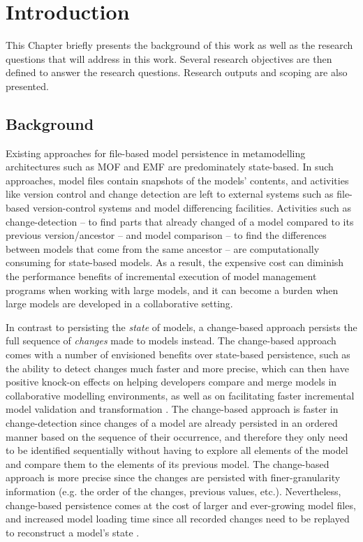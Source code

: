 \documentclass[12pt, a4paper]{report} \usepackage[titletoc]{appendix}
\begin{document}
\tableofcontents
{}

\listoffigures
\newpage
 
\listoftables
\newpage

\lstlistoflistings
\newpage

\chapter{Introduction}
\label{ch:introduction}
This Chapter briefly presents the background of this work as well as the research questions that will address in this work. Several research objectives are then defined to answer the research questions. Research outputs and scoping are also presented. 

\section{Background}
\label{sec:background}
Existing approaches for file-based model persistence in metamodelling architectures such as MOF and EMF are predominately state-based. In such approaches, model files contain snapshots of the models' contents, and activities like version control and change detection are left to external systems such as file-based version-control systems and model differencing facilities. Activities such as change-detection -- to find parts that already changed of a model compared to its previous version/ancestor -- and model comparison -- to find the differences between models that come from the same ancestor -- are computationally consuming for state-based models. As a result,  the expensive cost can diminish the performance benefits of incremental execution of model management programs when working with large models, and it can become a burden when large models are developed in a collaborative setting.

In contrast to persisting the \emph{state} of models, a change-based approach persists the full sequence of \emph{changes} made to models instead. The change-based approach comes with a number of envisioned benefits over state-based persistence, such as the ability to detect changes much faster and more precise, which can then have positive knock-on effects on helping developers compare and merge models in collaborative modelling environments, as well as on facilitating faster incremental model validation and transformation \cite{rath2012derived,ogunyomi2015property}. The change-based approach is faster in change-detection since changes of a model are already persisted in an ordered manner based on the sequence of their occurrence, and therefore they only need to be identified sequentially without having to explore all elements of the model and compare them to the elements of its previous model. The change-based approach is more precise since the changes are persisted with finer-granularity information (e.g. the order of the changes, previous values, etc.). Nevertheless, change-based persistence comes at the cost of larger and ever-growing model files, and increased model loading time since all recorded changes need to be replayed to reconstruct a model's state \cite{yohannis2017turning}.
\end{document}
